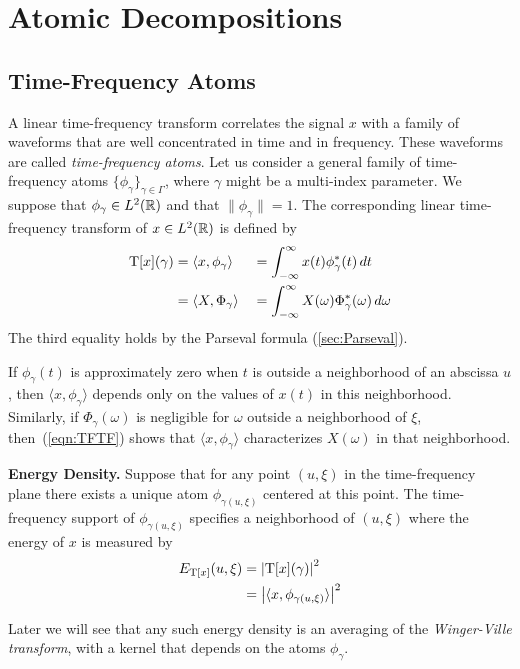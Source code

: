 \section{Atomic Decompositions}
\label{sec:atomic}
{\subsection{Time-Frequency Atoms\protect\footnotemark}
}
A linear time-frequency transform correlates the signal $x$ with a family of
waveforms that are well concentrated in time and in frequency.  These
waveforms are called \emph{time-frequency atoms}. Let us consider a general
family of time-frequency atoms  $\{\phi_{\gamma}\}_{\gamma \in \Gamma}$, 
where $\gamma$ might be a multi-index parameter.  We suppose that
$\phi_{\gamma} \in L^2(\mathbb{R})$ and that $\|\phi_{\gamma}\|=1$.  The
corresponding linear time-frequency transform of $x\in L^2(\mathbb{R})$ is defined
by  
\begin{alignat}{2}
\operatorname{T}[x](\gamma)   &=\langle x,\phi_{\gamma} \rangle
                &&=\int_{-\infty}^{\infty} x(t)\phi^*_{\gamma}(t)\,dt \nonumber \\
\label{eqn:TFTF}&=\langle X,\Phi_{\gamma} \rangle
                &&=\int_{-\infty}^{\infty} X(\omega)\Phi^*_{\gamma}(\omega)\,d\omega 
\end{alignat}
The third equality holds by the Parseval formula (\ref{sec:Parseval}).

If $\phi_{\gamma}(t)$ is approximately zero when $t$ is outside a
neighborhood of an abscissa $u$, then  
$\langle x,\phi_{\gamma}\rangle$ 
depends only on the values of $x(t)$ in this neighborhood.  Similarly,
if  $\Phi_{\gamma}(\omega)$ is negligible for $\omega$ outside a
neighborhood of $\xi$, then~(\ref{eqn:TFTF}) shows that  
$\langle x,\phi_{\gamma} \rangle$ characterizes $X(\omega)$ in that
neighborhood. 

\renewcommand{\thedefine}{}
\begin{define}{\bf Energy Density. }
Suppose that for any point $(u,\xi)$ in the time-frequency plane there
exists a unique atom $\phi_{\gamma(u,\xi)}$ centered at this point.
The time-frequency support of  
$\phi_{\gamma(u,\xi)}$ 
specifies a neighborhood of $(u,\xi)$ where the energy of $x$ is
measured by 
\begin{align} \label{eqn:energy}
E_{\operatorname{T}[x]}(u,\xi) &=\left|\operatorname{T}[x](\gamma)\right|^2 \\
 &=\left|\langle x,\phi_{\gamma(u,\xi)}\rangle\right|^2 \nonumber
\end{align}
\end{define}
Later we will see that any such energy density is an averaging of the
\emph{Winger-Ville transform}, with a kernel that depends on the
atoms $\phi_{\gamma}$.

